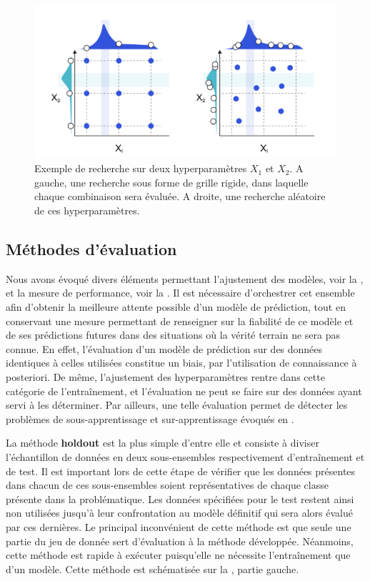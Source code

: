 \begin{figure}[H]
    \centering
    \includegraphics[width=\linewidth]{contents/chapter_3/resources/example_hyperparameter_selection.pdf}
    \caption{Exemple de recherche sur deux hyperparamètres $X_1$ et $X_2$. A gauche, une recherche sous forme de grille rigide, dans laquelle chaque combinaison sera évaluée. A droite, une recherche aléatoire de ces hyperparamètres.}
    \label{fig:example_hyperparameter_selection}
\end{figure}

\subsection{Méthodes d'évaluation}
Nous avons évoqué divers éléments permettant l'ajustement des modèles, voir la , et la mesure de performance, voir la . Il est nécessaire d'orchestrer cet ensemble afin d'obtenir la meilleure attente possible d'un modèle de prédiction, tout en conservant une mesure permettant de renseigner sur la fiabilité de ce modèle et de ses prédictions futures dans des situations où la vérité terrain ne sera pas connue. En effet, l'évaluation d'un modèle de prédiction sur des données identiques à celles utilisées constitue un biais, par l'utilisation de connaissance à posteriori. De même, l'ajustement des hyperparamètres rentre dans cette catégorie de l'entraînement, et l'évaluation ne peut se faire sur des données ayant servi à les déterminer. Par ailleurs, une telle évaluation permet de détecter les problèmes de sous-apprentissage et sur-apprentissage évoqués en .\par

La méthode \textbf{holdout} est la plus simple d'entre elle et consiste à diviser l’échantillon de données en deux sous-ensembles respectivement d'entraînement et de test. Il est important lors de cette étape de vérifier que les données présentes dans chacun de ces sous-ensembles soient représentatives de chaque classe présente dans la problématique. Les données spécifiées pour le test restent ainsi non utilisées jusqu'à leur confrontation au modèle définitif qui sera alors évalué par ces dernières. Le principal inconvénient de cette méthode est que seule une partie du jeu de donnée sert d'évaluation à la méthode développée. Néanmoins, cette méthode est rapide à exécuter puisqu'elle ne nécessite l'entraînement que d'un modèle. Cette méthode est schématisée sur la , partie gauche.\par

